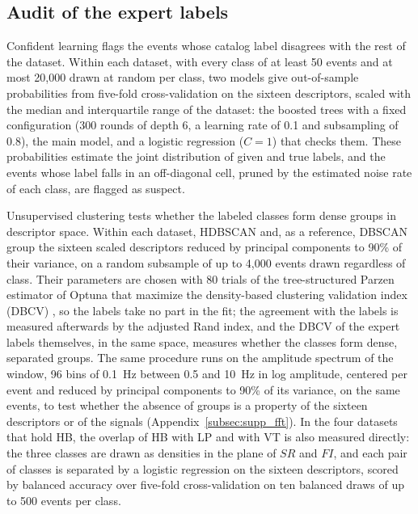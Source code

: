 \documentclass[pdflatex,sn-mathphys-num]{sn-jnl}
\begin{document}
\subsection{Audit of the expert labels}\label{subsec:audit}

Confident learning \cite{northcutt_confident_2021} flags the events whose
catalog label disagrees with the rest of the dataset. Within each dataset,
with every class of at least 50 events and at most 20{,}000 drawn at random
per class, two models give out-of-sample probabilities from five-fold
cross-validation on the sixteen descriptors, scaled with the median and
interquartile range of the dataset: the boosted trees with a fixed
configuration (300 rounds of depth 6, a learning rate of 0.1 and subsampling
of 0.8), the main model, and a logistic regression ($C = 1$) that checks
them. These probabilities estimate the joint distribution of given and true
labels, and the events whose label falls in an off-diagonal cell, pruned by
the estimated noise rate of each class, are flagged as suspect.

Unsupervised clustering tests whether the labeled classes form dense groups
in descriptor space. Within each dataset, HDBSCAN
\cite{campello_density-based_2013} and, as a reference, DBSCAN
\cite{ester_density-based_1996} group the
sixteen scaled descriptors reduced by principal components to 90\% of their
variance, on a random subsample of up to 4{,}000 events drawn regardless of
class. Their parameters are chosen with 80 trials of the tree-structured Parzen
estimator of Optuna that maximize the density-based clustering validation index (DBCV)
\cite{moulavi_density-based_2014}, so the labels take no part in the fit; the
agreement with the labels is measured afterwards by the adjusted Rand index,
and the DBCV of the expert labels themselves, in the same space, measures
whether the classes form dense, separated groups. The same procedure runs
on the amplitude spectrum of the window, 96 bins of 0.1~Hz between 0.5 and
10~Hz in log amplitude, centered per event and reduced by principal
components to 90\% of its variance, on the same events, to test whether
the absence of groups is a property of the sixteen descriptors or of the
signals (Appendix~\ref{subsec:supp_fft}).
In the four datasets that hold HB, the overlap of HB with LP and with VT is
also measured directly: the three classes are drawn as densities in the
plane of $SR$ and $FI$, and each pair of classes is separated by a logistic
regression on the sixteen descriptors, scored by balanced accuracy over
five-fold cross-validation on ten balanced draws of up to 500 events per
class.
\end{document}
